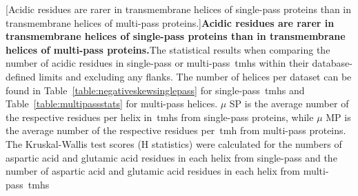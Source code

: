 \begin{table}[htbp]

  \centering
  [Acidic residues are rarer in transmembrane helices of single-pass proteins than in transmembrane helices of multi-pass proteins.]{\textbf{Acidic residues are rarer in transmembrane helices of single-pass proteins than in transmembrane helices of multi-pass proteins.}The statistical results when comparing the number of acidic residues in single-pass or multi-pass~\gls{tmh}s within their database-defined limits and excluding any flanks.
  The number of helices per dataset can be found in Table~\ref{table:negativeskewsinglepass} for single-pass~\gls{tmh}s and Table~\ref{table:multipassstats} for multi-pass helices.
  $\mu$ SP is the average number of the respective residues per helix in~\gls{tmh}s from single-pass proteins, while $\mu$ MP is the average number of the respective residues per~\gls{tmh} from multi-pass proteins.
  The Kruskal-Wallis test scores (H statistics) were calculated for the numbers of aspartic acid and glutamic acid residues in each helix from single-pass and the number of aspartic acid and glutamic acid residues in each helix from multi-pass~\gls{tmh}s}


\end{table}
